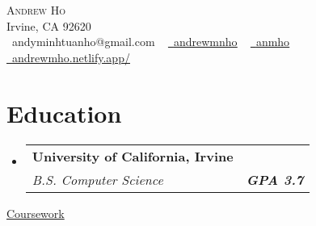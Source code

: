 \documentclass[letterpaper,11pt]{article}
\makeatletter
\newcommand{\resumeSubheading}[4]{
  \vspace{-2pt}\item
    \begin{tabular*}{1.0\textwidth}[t]{l@{\extracolsep{\fill}}r}
      \textbf{#1} & \textbf{\small #2} \\
      \textit{\small#3} & \textit{\small #4} \\
    \end{tabular*}\vspace{-7pt}
}
\newcommand{\resumeSubHeadingListStart}{\begin{itemize}[leftmargin=0.0in, label={}]}
\newcommand{\resumeSubHeadingListEnd}{\end{itemize}}
\makeatother
\begin{document}

\begin{center}
    {\Huge \scshape Andrew Ho} \\ \vspace{1pt}
    Irvine, CA 92620 \\ \vspace{1pt}
    \raisebox{-0.2\height}\faEnvelope\  {andyminhtuanho@gmail.com} ~
    \href{https://linkedin.com/in/andrewmnho/}{\raisebox{-0.2\height}\faLinkedin\ \underline{andrewmnho}}  ~
    \href{https://github.com/}{\raisebox{-0.2\height}\faGithub\ \underline{anmho}}~
    \href{https://andrewmho.netlify.app//}{\raisebox{-0.2\height}\faGlobe\ \underline{andrewmho.netlify.app/}}
    \vspace{-8pt}
\end{center}


\section{Education}
\resumeSubHeadingListStart
\resumeSubheading
{University of California, Irvine \normalfont{\small{}}}
{\normalfont{Exp. June 2024}}
{B.S. Computer Science} {\textbf{GPA 3.7}}
\resumeSubHeadingListEnd
\underline{Coursework}{}

\vspace{-4pt}
\end{document}
